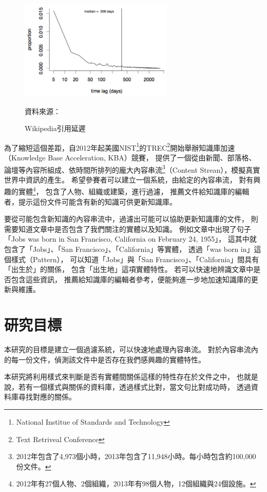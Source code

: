 \begin{figure}[h]
    \centering
    \includegraphics[width=0.65\textwidth]{images/01-wiki-cite-delay}
    \caption{Wikipedia引用延遲}
    資料來源：\cite{kba2012}
    \label{i:wikicitenews}
\end{figure}

為了縮短這個差距，自2012年起美國NIST\footnote{National Institue of Standards and Technology}的TREC\footnote{Text Retriveal Conference}開始舉辦知識庫加速（Knowledge Base Acceleration, KBA）競賽，
提供了一個從由新聞、部落格、論壇等內容所組成、依時間所排列的龐大內容串流\footnote{2012年包含了4,973個小時，2013年包含了11,948小時。\citep{kba2013}每小時包含約100,000份文件。}（Content Strean），模擬真實世界中資訊的產生。
希望參賽者可以建立一個系統，由給定的內容串流，
對有興趣的實體\footnote{2012年有27個人物、2個組織，2013年有98個人物，12個組織與24個設施。}，
包含了人物、組織或建築，進行過濾，
推薦文件給知識庫的編輯者，提示這份文件可能含有新的知識可供更新知識庫。

要從可能包含新知識的內容串流中，過濾出可能可以協助更新知識庫的文件，
則需要知道文章中是否包含了我們關注的實體以及知識。
例如文章中出現了句子「Jobs was born in San Francisco, California on February 24, 1955」，
這其中就包含了「Jobs」、「San Francisco」、「California」等實體，
透過「was born in」這個樣式（Pattern），
可以知道「Jobs」與「San Francisco」、「California」間具有「出生於」的關係，
包含「出生地」這項實體特性。
若可以快速地辨識文章中是否包含這些資訊，
推薦給知識庫的編輯者參考，便能夠進一步地加速知識庫的更新與維護。

%
%
\section{研究目標}
本研究的目標是建立一個過濾系統，可以快速地處理內容串流。
對於內容串流內的每一份文件，偵測該文件中是否存在我們感興趣的實體特性。

本研究將利用樣式來判斷是否有實體間關係這樣的特性存在於文件之中，
也就是說，若有一個樣式與關係的資料庫，透過樣式比對，當文句比對成功時，
透過資料庫尋找對應的關係。

